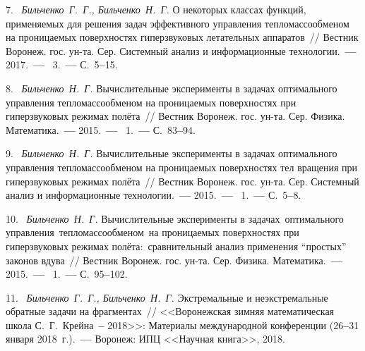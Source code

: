 7.~%
\textit{Бильченко~Г.~Г., Бильченко~Н.~Г.}\;
{%
  {О  некоторых  классах  функций,
   применяемых  для  решения  задач
   эффективного  управления  тепломассообменом
   на  проницаемых  поверхностях
   гиперзвуковых  летательных  аппаратов}~/$\!$/
  Вестник  Воронеж.  гос.  ун-та.
  Сер.  Системный  анализ
  и  информационные  технологии.~{\textbf{---}}
  2017.~{\textbf{---}}
  \No~3.~{\textbf{---}}
  С.~5{\textbf{--}}15.
  }

8.~%
\textit{Бильченко~Н.~Г.}\;
{%
 {Вычислительные  эксперименты
    в  задачах  оптимального  управления  тепломассообменом
    на  проницаемых  поверхностях
    при  гиперзвуковых  режимах  полёта}~/$\!$/
  Вестник  Воронеж.  гос.  ун-та.
  Сер.  Физика.  Математика.~{\textbf{---}}
  2015.~{\textbf{---}}
  \No~1.~{\textbf{---}}
  С.~83{\textbf{--}}94.
}

9.~%
\textit{Бильченко~Н.~Г.}\;
{%
  {Вычислительные  эксперименты
    в  задачах  оптимального  управления
    тепломассообменом  на  проницаемых  поверхностях
    тел  вращения
    при  гиперзвуковых  режимах  полёта}~/$\!$/
  Вестник  Воронеж.  гос.  ун-та.
  Сер.  Системный  анализ
  и  информационные  технологии.~{\textbf{---}}
  2015.~{\textbf{---}}
  \No~1.~{\textbf{---}}
  С.~5{\textbf{--}}8.
  }

10.~%
\textit{Бильченко~Н.~Г.}\;
{%
  {Вычислительные  эксперименты
    в
    задачах\,  оптимального\,  управления\,
    тепломассообменом\,
    на
    проницаемых  поверхностях
    при  гиперзвуковых  режимах  полёта:\,
    сравнительный  анализ
    применения  ``простых''  законов  вдува}~/$\!$/
  Вестник  Воронеж.  гос.  ун-та.
  Сер.  Физика.  Математика.~{\textbf{---}}
  2015.~{\textbf{---}}
  \No~1.~{\textbf{---}}
  С.~95{\textbf{--}}102.
}

11.~%
\textit{Бильченко~Г.~Г.,  Бильченко~Н.~Г.}\;
{%
  {Экстремальные  и  неэкстремальные
   обратные  задачи  на  фрагментах}~/$\!$/
  <<Воронежская  зимняя  математическая  школа
  С.~Г.~Крейна~{\textbf{--}}  2018>>:
  Материалы  международной  конференции
  (26{\textbf{--}}31  января  2018~г.).~{\textbf{---}}
  Воронеж:  ИПЦ  <<Научная  книга>>,
  2018.%
  }

